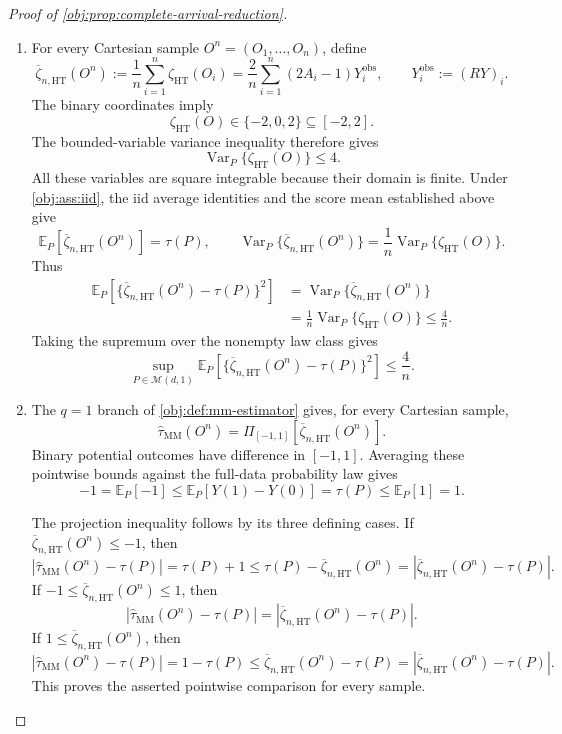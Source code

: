 \documentclass[11pt]{article}
\begin{document}
\begin{proof}[Proof of \cref{obj:prop:complete-arrival-reduction}]
\begin{enumerate}
\item For every Cartesian sample \(O^n=(O_1,\ldots,O_n)\), define
\[
\overline\zeta_{n,\mathrm{HT}}(O^n)
:=
\frac1n\sum_{i=1}^{n}\zeta_{\mathrm{HT}}(O_i)
=
\frac2n\sum_{i=1}^{n}(2A_i-1)Y_i^{\mathrm{obs}},
\qquad
Y_i^{\mathrm{obs}}:=(RY)_i.
\]
The binary coordinates imply
\[
\zeta_{\mathrm{HT}}(O)\in\{-2,0,2\}\subseteq[-2,2].
\]
The bounded-variable variance inequality therefore gives
\[
\operatorname{Var}_P\{\zeta_{\mathrm{HT}}(O)\}\le4.
\]
All these variables are square integrable because their domain is finite. Under \cref{obj:ass:iid}, the iid average identities and the score mean established above give
\[
\mathbb E_P[\overline\zeta_{n,\mathrm{HT}}(O^n)]=\tau(P),
\qquad
\operatorname{Var}_P\{\overline\zeta_{n,\mathrm{HT}}(O^n)\}
=
\frac1n\operatorname{Var}_P\{\zeta_{\mathrm{HT}}(O)\}.
\]
Thus
\[
\begin{aligned}
\mathbb E_P\!\left[
\{\overline\zeta_{n,\mathrm{HT}}(O^n)-\tau(P)\}^{2}
\right]
&=\operatorname{Var}_P\{\overline\zeta_{n,\mathrm{HT}}(O^n)\}\\
&=\frac1n\operatorname{Var}_P\{\zeta_{\mathrm{HT}}(O)\}
\le\frac4n.
\end{aligned}
\]
Taking the supremum over the nonempty law class gives
\[
\sup_{P\in\mathcal M(d,1)}
\mathbb E_P\!\left[
\{\overline\zeta_{n,\mathrm{HT}}(O^n)-\tau(P)\}^{2}
\right]
\le\frac4n.
\]

\item The \(q=1\) branch of \cref{obj:def:mm-estimator} gives, for every Cartesian sample,
\[
\widehat\tau_{\mathrm{MM}}(O^n)
=
\Pi_{[-1,1]}\!\left[\overline\zeta_{n,\mathrm{HT}}(O^n)\right].
\]
Binary potential outcomes have difference in \([-1,1]\). Averaging these pointwise bounds against the full-data probability law gives
\[
-1=\mathbb E_P[-1]
\le \mathbb E_P[Y(1)-Y(0)]
=\tau(P)
\le\mathbb E_P[1]=1.
\]

The projection inequality follows by its three defining cases. If
\(\overline\zeta_{n,\mathrm{HT}}(O^n)\le-1\), then
\[
\left|\widehat\tau_{\mathrm{MM}}(O^n)-\tau(P)\right|
=\tau(P)+1
\le\tau(P)-\overline\zeta_{n,\mathrm{HT}}(O^n)
=
\left|\overline\zeta_{n,\mathrm{HT}}(O^n)-\tau(P)\right|.
\]
If \(-1\le\overline\zeta_{n,\mathrm{HT}}(O^n)\le1\), then
\[
\left|\widehat\tau_{\mathrm{MM}}(O^n)-\tau(P)\right|
=
\left|\overline\zeta_{n,\mathrm{HT}}(O^n)-\tau(P)\right|.
\]
If \(1\le\overline\zeta_{n,\mathrm{HT}}(O^n)\), then
\[
\left|\widehat\tau_{\mathrm{MM}}(O^n)-\tau(P)\right|
=1-\tau(P)
\le\overline\zeta_{n,\mathrm{HT}}(O^n)-\tau(P)
=
\left|\overline\zeta_{n,\mathrm{HT}}(O^n)-\tau(P)\right|.
\]
This proves the asserted pointwise comparison for every sample.


\end{enumerate}
\end{proof}
\end{document}
